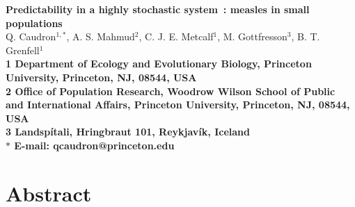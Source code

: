 \documentclass[10pt]{article}
\date{}
\begin{document}
\begin{flushleft}
{\Large
\textbf{Predictability in a highly stochastic system~: measles in small populations}
}
\\
Q. Caudron$^{1,\ast}$, 
A. S. Mahmud$^{2}$, 
C. J. E. Metcalf$^{1}$,
M. Gottfre{\dh}sson$^3$,
B. T. Grenfell$^{1}$
\\
\bf{1} Department of Ecology and Evolutionary Biology, Princeton University, Princeton, NJ, 08544, USA
\\
\bf{2} Office of Population Research, Woodrow Wilson School of Public and International Affairs, Princeton University, Princeton, NJ, 08544, USA
\\
\bf{3} Landsp\'{i}tali, Hringbraut 101, Reykjav\'{i}k, Iceland
\\
$\ast$ E-mail: qcaudron@princeton.edu
\end{flushleft}













\section*{Abstract}
\end{document}
